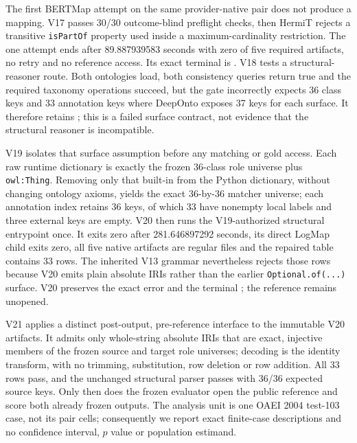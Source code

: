The first BERTMap attempt on the same provider-native pair does not produce a
mapping. V17 passes 30/30 outcome-blind preflight checks, then HermiT rejects a
transitive \texttt{isPartOf} property used inside a maximum-cardinality
restriction. The one attempt ends after 89.887939583 seconds with zero of five
required artifacts, no retry and no reference access. Its exact terminal is
.
V18 tests a structural-reasoner route. Both ontologies load, both consistency
queries return true and the required taxonomy operations succeed, but the gate
incorrectly expects 36 class keys and 33 annotation keys where DeepOnto exposes
37 keys for each surface. It therefore retains
;
this is a failed surface contract, not evidence that the structural reasoner is
incompatible.

V19 isolates that surface assumption before any matching or gold access. Each
raw runtime dictionary is exactly the frozen 36-class role universe plus
\texttt{owl:Thing}. Removing only that built-in from the Python dictionary,
without changing ontology axioms, yields the exact 36-by-36 matcher universe;
each annotation index retains 36 keys, of which 33 have nonempty local labels
and three external keys are empty. V20 then runs the V19-authorized structural
entrypoint once. It exits zero after 281.646897292 seconds, its direct LogMap
child exits zero, all five native artifacts are regular files and the repaired
table contains 33 rows. The inherited V13 grammar nevertheless rejects those
rows because V20 emits plain absolute IRIs rather than the earlier
\texttt{Optional.of(...)} surface. V20 preserves the exact error
 and the
terminal
;
the reference remains unopened.

V21 applies a distinct post-output, pre-reference interface to the immutable
V20 artifacts. It admits only whole-string absolute IRIs that are exact,
injective members of the frozen source and target role universes; decoding is
the identity transform, with no trimming, substitution, row deletion or row
addition. All 33 rows pass, and the unchanged structural parser passes with
36/36 expected source keys. Only then does the frozen evaluator open the public
reference and score both already frozen outputs. The analysis unit is one OAEI
2004 test-103 case, not its pair cells; consequently we report exact finite-case
descriptions and no confidence interval, $p$ value or population estimand.

